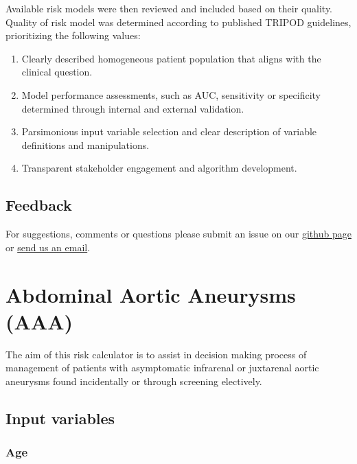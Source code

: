 \documentclass[
]{book}
\providecommand{\tightlist}{%
  \setlength{\itemsep}{0pt}\setlength{\parskip}{0pt}}
\begin{document}
Available risk models were then reviewed and included based on their quality. Quality of risk model was determined according to published TRIPOD guidelines,\citep{collinsTransparentReportingMultivariable2015, moonsTransparentReportingMultivariable2015} prioritizing the following values:

\begin{enumerate}
\def\labelenumi{\arabic{enumi}.}
\tightlist
\item
  Clearly described homogeneous patient population that aligns with the clinical question.
\item
  Model performance assessments, such as AUC, sensitivity or specificity determined through internal and external validation.
\item
  Parsimonious input variable selection and clear description of variable definitions and manipulations.
\item
  Transparent stakeholder engagement and algorithm development.
\end{enumerate}

\hypertarget{feedback}{%
\section{Feedback}\label{feedback}}

For suggestions, comments or questions please submit an issue on our \href{https://github.com/adam-mdmph/vascalc/issues}{github page} or \href{mailto:vascularcalculator@gmail.com}{send us an email}.

\hypertarget{aaa}{%
\chapter{Abdominal Aortic Aneurysms (AAA)}\label{aaa}}

The aim of this risk calculator is to assist in decision making process of management of patients with asymptomatic infrarenal or juxtarenal aortic aneurysms found incidentally or through screening electively.

\hypertarget{input-variables}{%
\section{Input variables}\label{input-variables}}

\hypertarget{age}{%
\subsection{Age}\label{age}}
\end{document}
